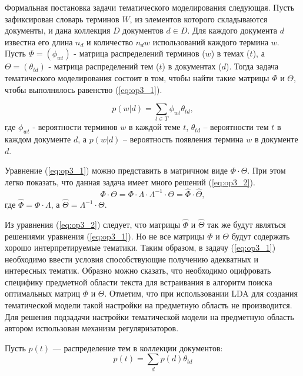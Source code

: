 Формальная постановка задачи тематического моделирования следующая. 
Пусть зафиксирован словарь терминов $W$, из элементов которого складываются документы, и дана коллекция $D$ документов $d \in D$. 
Для каждого документа $d$ известна его длина $n_d$ и количество $n_dw$ использований каждого термина $w$.
Пусть $\Phi=(\phi_{wt})$ - матрица распределений терминов ($w$) в темах ($t$), а  $\Theta=(\theta_{td})$  - матрица распределений тем ($t$) в документах ($d$). 
Тогда задача тематического моделирования состоит в том, чтобы найти такие матрицы  $\Phi$ и $\Theta$, чтобы выполнялось равенство (\ref{eq:op3_1}).

\begin{equation} 
\label{eq:op3_1}
p ( w \vert d ) = \sum_{t \in T} \phi_{wt} \theta_{td},
\end{equation}
где $ \phi_{wt} $ - вероятности терминов $w$ в каждой теме $t$, $\theta_{td}$ – вероятности тем $t$ в каждом документе $d$, а $ p ( w \vert d ) $ – вероятность появления термина $w$ в документе $d$.

Уравнение (\ref{eq:op3_1}) можно представить в матричном виде $ \Phi \cdot \Theta $. 
При этом легко показать, что данная задача имеет много решений (\ref{eq:op3_2}). 
\begin{equation} 
\label{eq:op3_2}
\Phi \cdot \Theta  = \Phi \cdot \Lambda \cdot \Lambda^{-1} \cdot \Theta = \hat{\Phi} \cdot \hat{\Theta},
\end{equation}
где $\hat{\Phi} = \Phi \cdot \Lambda $, а  $\hat{\Theta} = \Lambda^{-1} \cdot \Theta$.

Из уравнения (\ref{eq:op3_2})  следует, что матрицы $\hat{\Phi}$ и $\hat{\Theta}$ так же будут являться решениями уравнения (\ref{eq:op3_1}).
Но не все матрицы $\Phi$ и $\Theta$ будут содержать хорошо интерпретируемые тематики. 
Таким образом, в задачу (\ref{eq:op3_1}) необходимо ввести условия способствующие получению адекватных и интересных тематик. 
Образно можно сказать, что необходимо оцифровать специфику предметной области текста для встраивания в алгоритм поиска оптимальных матриц $\Phi$ и $\Theta$. 
Отметим, что при использовании LDA для создания тематической модели такой настройки на предметную область не производится.
Для решения подзадачи настройки тематической модели на предметную область автором использован механизм регуляризаторов. 

Пусть $p \left( t \right) $ — распределение тем в коллекции документов:
\begin{equation} 
\label{eq:op3_3}
p \left( t \right) = \sum_d p \left( d \right)  \theta_{td}
\end{equation}

